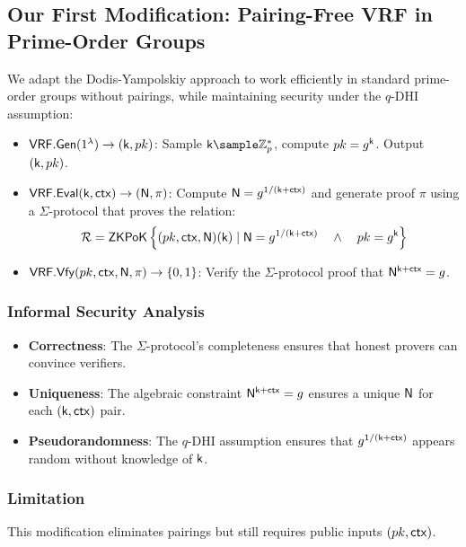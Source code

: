 \subsection{Our First Modification: Pairing-Free VRF in Prime-Order Groups}
We adapt the Dodis-Yampolskiy approach to work efficiently in standard prime-order groups without pairings, while maintaining security under the $q$-DHI assumption:

\begin{itemize}
    \item $\mathsf{VRF.Gen}(1^\lambda) \to (\mathsf{k}, pk)$: Sample $\k \sample \mathbb{Z}_p^*$, compute $pk = g^{\mathsf{k}}$. Output $(\mathsf{k}, pk)$.
    \item $\mathsf{VRF.Eval}(\mathsf{k}, \mathsf{ctx}) \to (\mathsf{N}, \pi)$: Compute $\mathsf{N} = g^{1/(\mathsf{k} + \mathsf{ctx})}$ and generate proof $\pi$ using a $\Sigma$-protocol that proves the relation:
    \[
    \mathcal{R} = {\mathsf{ZKPoK}} \left\{(pk, \mathsf{ctx}, \mathsf{N}) (\mathsf{k}) \mid \mathsf{N} = g^{1/(\mathsf{k} + \mathsf{ctx})} \quad \wedge \quad pk = g^{\mathsf{k}}  \right\}
    \]
    \item $\mathsf{VRF.Vfy}(pk, \mathsf{ctx}, \mathsf{N}, \pi) \to \{0,1\}$: Verify the $\Sigma$-protocol proof that $\mathsf{N}^{\mathsf{k}+\mathsf{ctx}} = g$.
\end{itemize}

\subsubsection{Informal Security Analysis}
\begin{itemize}
    \item \textbf{Correctness}: The $\Sigma$-protocol's completeness ensures that honest provers can convince verifiers.
    \item \textbf{Uniqueness}: The algebraic constraint $\mathsf{N}^{\mathsf{k}+\mathsf{ctx}} = g$ ensures a unique $\mathsf{N}$ for each $(\mathsf{k},\mathsf{ctx})$ pair.
    \item \textbf{Pseudorandomness}: The $q$-DHI assumption ensures that $g^{1/(\mathsf{k}+\mathsf{ctx})}$ appears random without knowledge of $\mathsf{k}$.
\end{itemize}

\subsubsection{Limitation}
This modification eliminates pairings but still requires public inputs $(pk, \mathsf{ctx})$.












